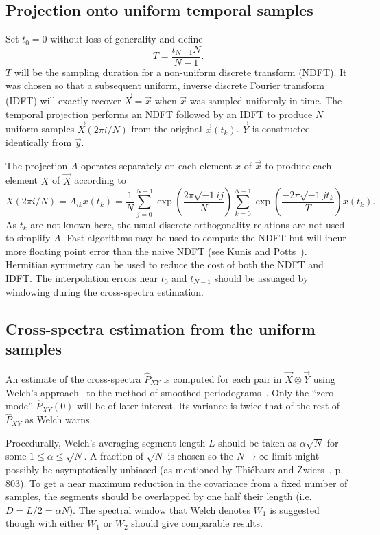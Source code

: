 \documentclass[letterpaper,11pt,nointlimits,reqno]{amsart}
\begin{document}
\subsection*{Projection onto uniform temporal samples}

Set $t_0=0$ without loss of generality and define
$$
T = \frac{t_{N-1} N}{N-1}.
$$
$T$ will be the sampling duration for a non-uniform discrete transform (NDFT).
It was chosen so that a subsequent uniform, inverse discrete Fourier transform
(IDFT) will exactly recover $\vec{X}=\vec{x}$ when $\vec{x}$ was sampled
uniformly in time.  The temporal projection performs an NDFT followed by an
IDFT to produce $N$ uniform samples $\vec{X}\left(2\pi{}i/N\right)$ from the
original $\vec{x}\left(t_k\right)$.  $\vec{Y}$ is constructed identically from
$\vec{y}$.

The projection $A$ operates separately on each element $x$ of $\vec{x}$
to produce each element $X$ of $\vec{X}$ according to
$$
    X\left(2\pi{}i/N\right)
    =
    A_{ik} x\left(t_k\right)
    =
    \frac{1}{N}
    \sum_{j=0}^{N-1} \exp\left(\frac{ 2\pi\sqrt{-1} i j   }{N} \right)
    \sum_{k=0}^{N-1} \exp\left(\frac{-2\pi\sqrt{-1} j t_k }{T} \right)
    x\left(t_k\right)
.
$$
As $t_k$ are not known here, the usual discrete orthogonality relations are not
used to simplify $A$.  Fast algorithms may be used to compute the NDFT but will
incur more floating point error than the naive NDFT (see Kunis and
Potts~\cite{Kunis2008Time}).  Hermitian symmetry can be used to reduce the cost
of both the NDFT and IDFT.  The interpolation errors near $t_0$ and $t_{N-1}$
should be assuaged by windowing during the cross-spectra estimation.

\subsection*{Cross-spectra estimation from the uniform samples}

An estimate of the cross-spectra $\hat{P}_{XY}$ is computed for each pair in
$\vec{X} \otimes \vec{Y}$ using Welch's approach~\cite{Welch1967Use} to the
method of smoothed periodograms~\cite{Bartlett1948Smoothing}.  Only the ``zero
mode'' $\hat{P}_{XY}(0)$ will be of later interest.  Its variance is twice that
of the rest of $\hat{P}_{XY}$ as Welch warns.

Procedurally, Welch's averaging segment length $L$ should be taken as
$\alpha\sqrt{N}$ for some $1\le\alpha\le\sqrt{N}$.  A fraction of $\sqrt{N}$ is
chosen so the $N\to\infty$ limit might possibly be asymptotically unbiased (as
mentioned by Thi\'{e}baux and Zwiers~\cite{Thiebaux1984Interpretation}, p.
803).  To get a near maximum reduction in the covariance from a fixed number of
samples, the segments should be overlapped by one half their length (i.e.  $D =
L / 2 = \alpha{}N$).  The spectral window that Welch denotes $W_1$ is suggested
though with either $W_1$ or $W_2$ should give comparable results.
\end{document}

